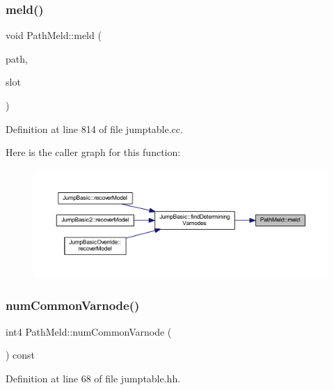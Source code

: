 \subsubsection{\texorpdfstring{meld()}{meld()}}
{\footnotesize\ttfamily void Path\+Meld\+::meld (\begin{DoxyParamCaption}\item[{vector$<$ \mbox{\hyperlink{class_pcode_op}{Pcode\+Op}} $\ast$ $>$ \&}]{path,  }\item[{vector$<$ int4 $>$ \&}]{slot }\end{DoxyParamCaption})}



Definition at line 814 of file jumptable.\+cc.

Here is the caller graph for this function\+:
\nopagebreak
\begin{figure}[H]
\begin{center}
\leavevmode
\includegraphics[width=350pt]{class_path_meld_a62b0bd2c4340c6f116bdcde53fb23aad_icgraph}
\end{center}
\end{figure}
\mbox{\label{class_path_meld_a62cd3e5f48e44c7f91ae528d9226125c}} 
\subsubsection{\texorpdfstring{numCommonVarnode()}{numCommonVarnode()}}
{\footnotesize\ttfamily int4 Path\+Meld\+::num\+Common\+Varnode (\begin{DoxyParamCaption}\item[{void}]{ }\end{DoxyParamCaption}) const\hspace{0.3cm}{\ttfamily [inline]}}



Definition at line 68 of file jumptable.\+hh.

